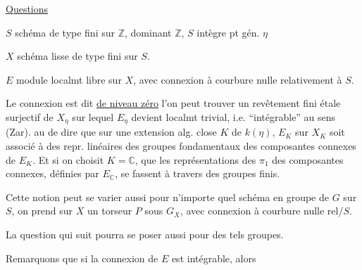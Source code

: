 
\uline{Questions}

$S$ schéma de type fini sur $\mathbb Z$, dominant $\mathbb Z$, $S$ intègre pt gén. $\eta$

$X$ schéma lisse de type fini sur $S$.

$E$ module localmt libre sur $X$, avec connexion à courbure nulle relativement à $S$.

Le  connexion  est dit \uline{de niveau zéro}   l'on peut trouver un revêtement fini étale surjectif de $X_{\eta}$ sur lequel $E_{\eta}$ devient localmt trivial, i.e. ``intégrable'' au sens (Zar).   au \unsure{$\simeq$|$=$} de dire que sur une extension alg. close  $K$ de $k(\eta)$, $E_K$ sur $X_K$ soit associé à des repr. linéaires des groupes fondamentaux des composantes connexes de $E_K$. Et si on choisit $K=\mathbb C$, que les représentations des $\pi_1$  des composantes  connexes, définies par $E_{\mathbb C}$,  se fassent à travers des groupes finis.



Cette notion peut se varier aussi pour n'importe quel schéma en groupe de  $G$ sur $S$, on prend sur $X$ un torseur $P$ sous $G_X$, avec connexion à courbure nulle rel/$S$.

La question qui suit pourra se poser aussi pour des tels groupes.

Remarquons que si la connexion de $E$ est intégrable, alors

